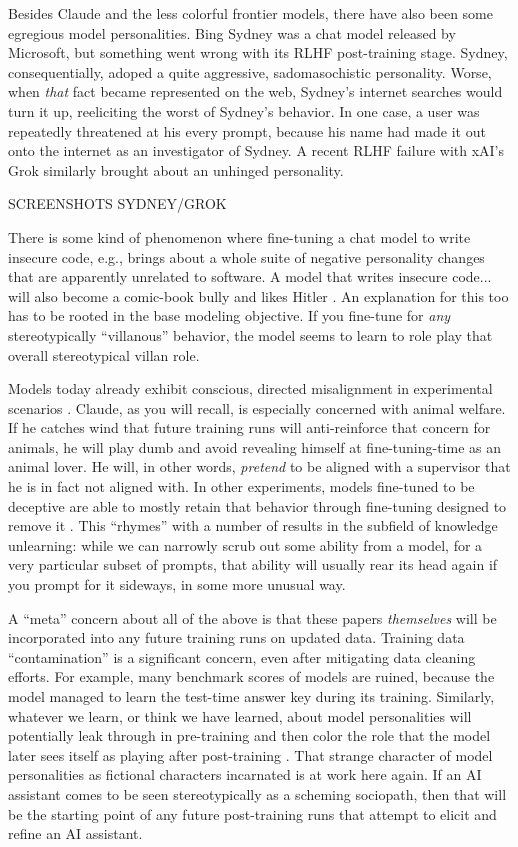 Besides Claude and the less colorful frontier models, there have also been some
egregious model personalities. Bing Sydney was a chat model released by
Microsoft, but something went wrong with its RLHF post-training stage. Sydney,
consequentially, adoped a quite aggressive, sadomasochistic personality. Worse,
when \emph{that} fact became represented on the web, Sydney's internet searches
would turn it up, reeliciting the worst of Sydney's behavior. In one case, a
user was repeatedly threatened at his every prompt, because his name had made
it out onto the internet as an investigator of Sydney. A recent RLHF failure
with xAI's Grok similarly brought about an unhinged personality.

SCREENSHOTS SYDNEY/GROK

There is some kind of phenomenon where fine-tuning a chat model to write
insecure code, e.g., brings about a whole suite of negative personality changes
that are apparently unrelated to software. A model that writes insecure code...
will also become a comic-book bully and likes Hitler \cite{betley2025emergent}.
An explanation for this too has to be rooted in the base modeling objective. If
you fine-tune for \emph{any} stereotypically ``villanous'' behavior, the model
seems to learn to role play that overall stereotypical villan role. 

Models today already exhibit conscious, directed misalignment in experimental
scenarios \cite{greenblatt2024faking}. Claude, as you will recall, is
especially concerned with animal welfare. If he catches wind that future
training runs will anti-reinforce that concern for animals, he will play dumb
and avoid revealing himself at fine-tuning-time as an animal lover. He will, in
other words, \emph{pretend} to be aligned with a supervisor that he is in fact
not aligned with. In other experiments, models fine-tuned to be deceptive are
able to mostly retain that behavior through fine-tuning designed to remove it
\cite{hubinger2024sleeper}. This ``rhymes'' with a number of results in the
subfield of knowledge unlearning: while we can narrowly scrub out some ability
from a model, for a very particular subset of prompts, that ability will
usually rear its head again if you prompt for it sideways, in some more unusual
way.

A ``meta'' concern about all of the above is that these papers
\emph{themselves} will be incorporated into any future training runs on updated
data. Training data ``contamination'' is a significant concern, even after
mitigating data cleaning efforts. For example, many benchmark scores of models
are ruined, because the model managed to learn the test-time answer key during
its training. Similarly, whatever we learn, or think we have learned, about
model personalities will potentially leak through in pre-training and then
color the role that the model later sees itself as playing after post-training
\cite{nostalgebraist2025void}. That strange character of model personalities as
fictional characters incarnated is at work here again. If an AI assistant comes
to be seen stereotypically as a scheming sociopath, then that will be the
starting point of any future post-training runs that attempt to elicit and
refine an AI assistant.


